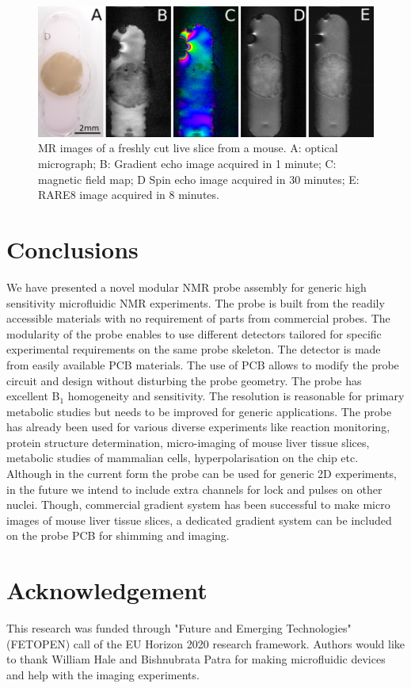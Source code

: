 \documentclass[preprint,12pt]{article}
\begin{document}
\begin{figure}
\centering
\includegraphics[width=\linewidth,keepaspectratio=true]{./figures/ms5n17-tisli-im-180511.png} 
\caption{MR images of a freshly cut live slice from a mouse. A: optical micrograph; B: Gradient echo image acquired in 1 minute; C: magnetic field map; D Spin echo image acquired in 30 minutes; E: RARE8 image acquired in 8 minutes.}
\label{fig:tisli} 
\end{figure}
\section{Conclusions}
We have presented a novel modular NMR probe assembly for generic high sensitivity microfluidic NMR experiments. The probe is built from the readily accessible materials with no requirement of parts from commercial probes. The modularity of the probe enables to use different detectors tailored for specific experimental requirements on the same probe skeleton. The detector is made from easily available PCB materials. The use of PCB allows to modify the probe circuit and design without disturbing the probe geometry. The probe has excellent B$_1$ homogeneity and sensitivity. The resolution is reasonable for primary metabolic studies but needs to be improved for generic applications. The probe has already been used for various diverse experiments like reaction monitoring, protein structure determination, micro-imaging of mouse liver tissue slices, metabolic studies of mammalian cells, hyperpolarisation on the chip etc. Although in the current form the probe can be used for generic 2D experiments, in the future we intend to include extra channels for lock and pulses on other nuclei. Though, commercial gradient system has been successful to make micro images of mouse liver tissue slices, a dedicated gradient system can be included on the probe PCB for shimming and imaging.
\section{Acknowledgement}
This research was funded through "Future and Emerging Technologies" (FETOPEN) call of the EU Horizon 2020 research framework. Authors would like to thank William Hale and Bishnubrata Patra for making microfluidic devices and help with the imaging experiments.
\clearpage


\end{document}

